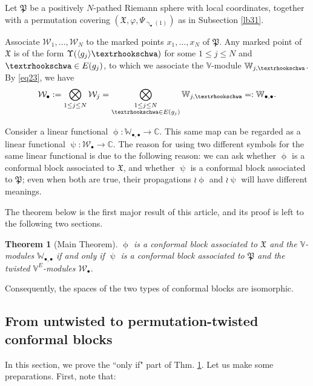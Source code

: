 \documentclass[11pt,b5paper,notitlepage]{article}
\theoremstyle{definition}
\theoremstyle{plain}
\newtheorem{thm}[df]{Theorem}
\newcommand{\fk}{\mathfrak}
\newcommand{\mc}{\mathcal}
\newcommand{\bk}[1]{\langle {#1}\rangle}
\newcommand{\blt}{\bullet}
\newcommand{\Vbb}{\mathbb V}
\newcommand{\Wbb}{\mathbb W}
\newcommand{\Cbb}{\mathbb C}
\newcommand{\tipae}{\text{\textrhookschwa}}
\numberwithin{equation}{subsection}
\begin{document}
Let $\fk P$ be a positively $N$-pathed Riemann sphere with local coordinates, together with a permutation covering $(\fk X,\varphi,\Psi_{\upgamma_\blt(1)})$ as in Subsection \ref{lb31}.

Associate $\mc W_1,\dots,\mc W_N$ to the marked points $x_1,\dots,x_N$ of $\fk P$. Any marked point of $\fk X$ is of the form $\Upsilon(\bk{g_j}\tipae)$ for some $1\leq j\leq N$ and $\tipae\in E(g_j)$, to which we associate the $\Vbb$-module $\Wbb_{j,\tipae}$. By \eqref{eq23}, we have
\begin{align*}
	\mc W_\blt:=\bigotimes_{1\leq j\leq N}\mc W_j=\bigotimes_{\begin{subarray}{c}
			1\leq j\leq N\\	
			\tipae\in E(g_j)
	\end{subarray}}\Wbb_{j,\tipae}=:\Wbb_{\blt,\blt}.
\end{align*}

Consider a linear functional $\upphi:\Wbb_{\blt,\blt}\rightarrow\Cbb$. This same map can be regarded as a linear functional $\uppsi:\mc W_\blt\rightarrow\Cbb$. The reason for using two different symbols for the same linear functional is due to the following reason: we can ask whether $\upphi$ is a conformal block associated to $\fk X$, and whether $\uppsi$ is a conformal block associated to $\fk P$; even when both are true, their propagations $\wr\upphi$ and $\wr\uppsi$ will have different meanings.


The theorem below is the first major result of this article, and its proof is left to the following two sections.

\begin{thm}[Main Theorem]\label{lb14}
$\upphi$ is a conformal block associated to $\fk X$ and the $\Vbb$-modules $\Wbb_{\blt,\blt}$ if and only if $\uppsi$ is a conformal block associated to $\fk P$ and the twisted $\Vbb^E$-modules $\mc W_\blt$.
\end{thm}


Consequently, the spaces of the two types of conformal blocks are isomorphic.



\subsection{From untwisted to permutation-twisted conformal blocks}\label{lb1}






In this section, we prove the ``only if" part of Thm. \ref{lb14}. Let us  make some preparations. First, note that:
\end{document}

